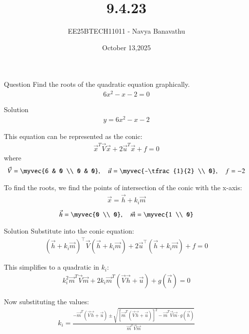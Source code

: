 \documentclass{beamer}
\title{9.4.23}
\date{October 13,2025}
\author{EE25BTECH11011 - Navya Banavathu}
\begin{document}
\frame{\titlepage}

\begin{frame}{Question}
Find the roots of the quadratic equation graphically.
\begin{align}
6x^2 - x - 2 = 0
\end{align}
\end{frame}

\begin{frame}{Solution}
\begin{align}
y = 6x^2 - x - 2
\end{align}

This equation can be represented as the conic:
\begin{align}
\vec{x}^T\vec{V}\vec{x} + 2\vec{u}^T\vec{x} + f = 0
\end{align}
where
\begin{align}
\vec{V} = \myvec{6 & 0 \\ 0 & 0}, \quad 
\vec{u} = \myvec{-\tfrac{1}{2} \\ 0}, \quad 
f = -2
\end{align}

To find the roots, we find the points of intersection of the conic with the x-axis:
\begin{align}
\vec{x} = \vec{h} + k_i\vec{m}    
\end{align}
\begin{align}
\vec{h}=\myvec{0 \\ 0}, \quad \vec{m} = \myvec{1 \\ 0}
\end{align}
\end{frame}

\begin{frame}{Solution}
Substitute into the conic equation:
\begin{align}
(\vec{h} + k_i \vec{m})^{\top} \vec{V} (\vec{h} + k_i \vec{m}) 
+ 2\vec{u}^{\top} (\vec{h} + k_i \vec{m}) + f = 0
\end{align}

This simplifies to a quadratic in \( k_i \):
\begin{align}
k_i^2 \vec{m}^T \vec{V} \vec{m} 
+ 2k_i \vec{m}^T (\vec{V}\vec{h} + \vec{u}) 
+ g(\vec{h}) = 0
\end{align}

Now substituting the values:
\begin{align}
k_i = 
\frac{ -\vec{m}^T(\vec{V}\vec{h} + \vec{u}) 
\pm \sqrt{ [\vec{m}^T(\vec{V}\vec{h} + \vec{u})]^2 
- \vec{m}^T\vec{V}\vec{m} \cdot g(\vec{h}) } }
{\vec{m}^T \vec{V} \vec{m}}
\end{align}
\end{frame}
\end{document}
